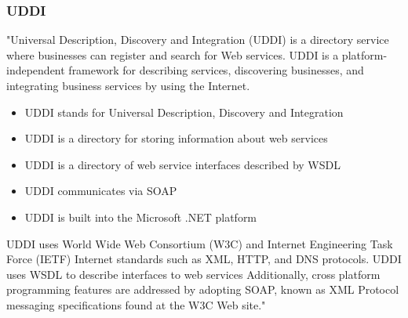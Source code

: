 \documentclass[12pt]{article}
\begin{document}
\subsubsection{UDDI}
"Universal Description, Discovery and Integration (UDDI) is a directory service where businesses can register and search for Web services.
UDDI is a platform-independent framework for describing services, discovering businesses, and integrating business services by using the Internet.\\
\begin{itemize}
\item UDDI stands for Universal Description, Discovery and Integration
\item UDDI is a directory for storing information about web services
\item UDDI is a directory of web service interfaces described by WSDL
\item UDDI communicates via SOAP
\item UDDI is built into the Microsoft .NET platform
\end{itemize}
UDDI uses World Wide Web Consortium (W3C) and Internet Engineering Task Force (IETF) Internet standards such as XML, HTTP, and DNS protocols.
UDDI uses WSDL to describe interfaces to web services Additionally, cross platform programming features are addressed by adopting SOAP, known as XML Protocol messaging specifications found at the W3C Web site."\cite{uddi}
\end{document}

